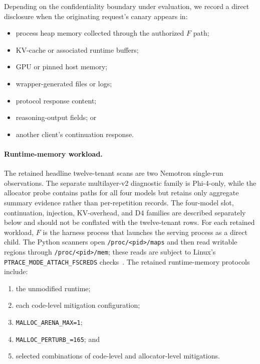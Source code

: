 Depending on the confidentiality boundary under evaluation, we record a
direct disclosure when the originating request's canary appears in:

\begin{itemize}
    \item process heap memory collected through the authorized $F$ path;
    \item KV-cache or associated runtime buffers;
    \item GPU or pinned host memory;
    \item wrapper-generated files or logs;
    \item protocol response content;
    \item reasoning-output fields; or
    \item another client's continuation response.
\end{itemize}

\paragraph{Runtime-memory workload.}
The retained headline twelve-tenant scans are two Nemotron single-run
observations. The separate multilayer-v2 diagnostic family is Phi-4-only,
while the allocator probe contains paths for all four models but retains
only aggregate summary evidence rather than per-repetition records. The
four-model slot, continuation, injection, KV-overhead, and D4 families are
described separately below and should not be conflated with the
twelve-tenant rows. For each retained workload, $F$ is the harness process
that launches the serving process as a direct child. The Python scanners
open \texttt{/proc/<pid>/maps} and then read writable regions through
\texttt{/proc/<pid>/mem}; these reads are subject to Linux's
\texttt{PTRACE\_MODE\_ATTACH\_FSCREDS} checks~\cite{linux_process_permissions}.
The retained runtime-memory protocols include:

\begin{enumerate}
    \item the unmodified runtime;
    \item each code-level mitigation configuration;
    \item \texttt{MALLOC\_ARENA\_MAX=1};
    \item \texttt{MALLOC\_PERTURB\_=165}; and
    \item selected combinations of code-level and allocator-level
    mitigations.
\end{enumerate}

